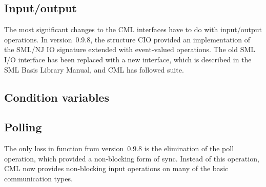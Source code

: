 \subsection{Input/output}


The most significant changes to the CML interfaces have to do with input/output operations. In version~0.9.8, the structure {\cf \small CIO} provided an implementation of the SML/NJ {\cf \small IO} signature extended with event-valued operations. The old SML I/O interface has been replaced with a new interface, which is described in the SML Basis Library Manual, and CML has followed suite.\subsection{Condition variables}
\subsection{Polling}


The only loss in function from version~0.9.8 is the elimination of the {\cf \small poll} operation, which provided a non-blocking form of {\cf \small sync}. Instead of this operation, CML now provides non-blocking input operations on many of the basic communication types.
